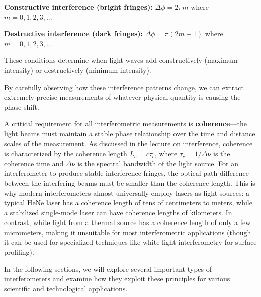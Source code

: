 \documentclass[
  a4paper,
]{book}
\begin{document}
\begin{tcolorbox}[enhanced jigsaw, breakable, toptitle=1mm, bottomrule=.15mm, colbacktitle=quarto-callout-tip-color!10!white, title=\textcolor{quarto-callout-tip-color}{\faLightbulb}\hspace{0.5em}{Interference Conditions}, arc=.35mm, rightrule=.15mm, bottomtitle=1mm, opacityback=0, toprule=.15mm, coltitle=black, leftrule=.75mm, opacitybacktitle=0.6, colback=white, left=2mm, titlerule=0mm, colframe=quarto-callout-tip-color-frame]

\textbf{Constructive interference (bright fringes):}
\(\Delta \phi = 2\pi m\) where \(m = 0, 1, 2, 3, ...\)

\textbf{Destructive interference (dark fringes):}
\(\Delta \phi = \pi(2m + 1)\) where \(m = 0, 1, 2, 3, ...\)

These conditions determine when light waves add constructively (maximum
intensity) or destructively (minimum intensity).

\end{tcolorbox}

By carefully observing how these interference patterns change, we can
extract extremely precise measurements of whatever physical quantity is
causing the phase shift.

A critical requirement for all interferometric measurements is
\textbf{coherence}---the light beams must maintain a stable phase
relationship over the time and distance scales of the measurement. As
discussed in the lecture on interference, coherence is characterized by
the coherence length \(L_c = c\tau_c\), where \(\tau_c = 1/\Delta\nu\)
is the coherence time and \(\Delta\nu\) is the spectral bandwidth of the
light source. For an interferometer to produce stable interference
fringes, the optical path difference between the interfering beams must
be smaller than the coherence length. This is why modern interferometers
almost universally employ lasers as light sources: a typical HeNe laser
has a coherence length of tens of centimeters to meters, while a
stabilized single-mode laser can have coherence lengths of kilometers.
In contrast, white light from a thermal source has a coherence length of
only a few micrometers, making it unsuitable for most interferometric
applications (though it can be used for specialized techniques like
white light interferometry for surface profiling).

In the following sections, we will explore several important types of
interferometers and examine how they exploit these principles for
various scientific and technological applications.
\end{document}
